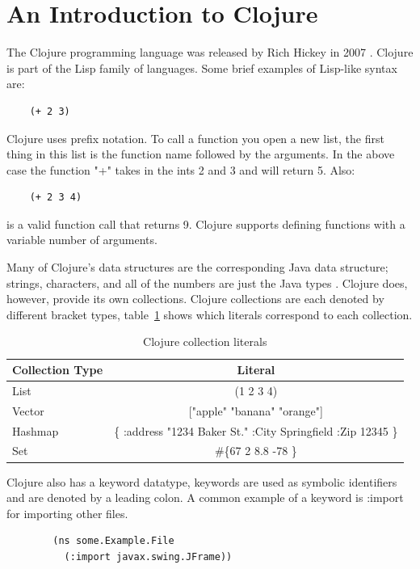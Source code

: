 \documentclass[12pt]{article}
\begin{document}
\newpage
\setcounter{page}{1}

\section{An Introduction to Clojure}\label{sec:intro}
	The Clojure programming language was released by Rich Hickey in 2007 \cite{wiki}. Clojure is part of the Lisp family of languages. Some brief examples of Lisp-like syntax are:
	\begin{verbatim}
	(+ 2 3)
	\end{verbatim}
	Clojure uses prefix notation. To call a function you open a new list, the first thing in this list is the function name followed by the arguments. In the above case the function "+" takes in the ints 2 and 3 and will return 5. Also:
	\begin{verbatim}
	(+ 2 3 4)
	\end{verbatim} 
	
	is a valid function call that returns 9. Clojure supports defining functions with a variable number of arguments. 
	
	Many of Clojure's data structures are the corresponding Java data structure; strings, characters, and all of the numbers are just the Java types \cite{cloj:structs}. Clojure does, however, provide its own collections. Clojure collections are each denoted by different bracket types, table~\ref{coll:table} shows which literals correspond to each collection.
	
	\begin{table}[H]
	\caption{Clojure collection literals\label{coll:table}}	
	\begin{tabular}{ | l | c | }
	\hline
	Collection Type & Literal \\ \hline
	List & (1 2 3 4) \\ \hline
	Vector & ["apple" "banana" "orange"] \\ \hline
	Hashmap & \{ :address "1234 Baker St." :City Springfield :Zip 12345 \} \\ \hline
	Set & \#\{67 2 8.8 -78 \} \\
	\hline
	\end{tabular}
	\end{table}
	
	Clojure also has a keyword datatype, keywords are used as symbolic identifiers and are denoted by a leading colon. A common example of a keyword is :import for importing other files. 
	
	\begin{verbatim}
		(ns some.Example.File
		  (:import javax.swing.JFrame))
	\end{verbatim}
	
\end{document}
